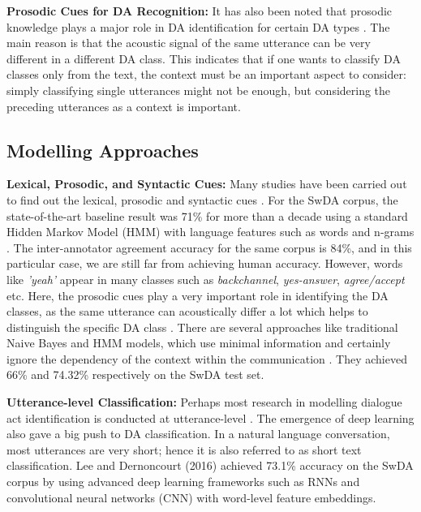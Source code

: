 \documentclass[10pt, a4paper]{article}
\begin{document}
\textbf{Prosodic Cues for DA Recognition:} It has also been noted that prosodic knowledge plays a major role in DA identification for certain DA types \cite{Jurafsky1998,stolcke2000dialogue}.
The main reason is that the acoustic signal of the same utterance can be very different in a different DA class. 
This indicates that if one wants to classify DA classes only from the text, the context must be an important aspect to consider: simply classifying single utterances might not be enough, but considering the preceding utterances as a context is important.

\subsection{Modelling Approaches}

\textbf{Lexical, Prosodic, and Syntactic Cues:}
Many studies have been carried out to find out the lexical, prosodic and syntactic cues \cite{stolcke2000dialogue,surendran2006dialog,o2012multi,yang2014semi}. 
For the SwDA corpus, the state-of-the-art baseline result was 71\% for more than a decade using a standard Hidden Markov Model (HMM) with language features such as words and n-grams \cite{stolcke2000dialogue}.
The inter-annotator agreement accuracy for the same corpus is 84\%, and in this particular case, we are still far from achieving human accuracy.
However, words like \textit{'yeah'} appear in many classes such as \textit{backchannel}, \textit{yes-answer}, \textit{agree/accept} etc.
Here, the prosodic cues play a very important role in identifying the DA classes, as the same utterance can acoustically differ a lot which helps to distinguish the specific DA class \cite{shriberg1998can}. 
There are several approaches like traditional Naive Bayes and HMM models, which use minimal information and certainly ignore the dependency of the context within the communication \cite{grau2004dialogue,tavafi2013dialogue}. They achieved 66\% and 74.32\% respectively on the SwDA test set. 



\textbf{Utterance-level Classification:}
Perhaps most research in modelling dialogue act identification is conducted at utterance-level \cite{stolcke2000dialogue,grau2004dialogue,tavafi2013dialogue,ji2016latent,khanpour2016dialogue,lee2016sequential}. 
The emergence of deep learning also gave a big push to DA classification.
In a natural language conversation, most utterances are very short; hence it is also referred to as short text classification. 
Lee and Dernoncourt (2016) achieved 73.1\% accuracy on the SwDA corpus by using advanced deep learning frameworks such as RNNs and convolutional neural networks (CNN) with word-level feature embeddings.
\end{document}
